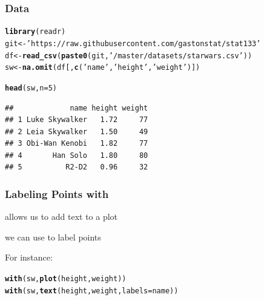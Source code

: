 \documentclass[12pt]{beamer}\usepackage[]{graphicx}\usepackage[]{color}
\makeatletter
\newcommand{\hlnum}[1]{\textcolor[rgb]{0.686,0.059,0.569}{#1}}%
\newcommand{\hlstr}[1]{\textcolor[rgb]{0.192,0.494,0.8}{#1}}%
\newcommand{\hlstd}[1]{\textcolor[rgb]{0.345,0.345,0.345}{#1}}%
\newcommand{\hlkwb}[1]{\textcolor[rgb]{0.69,0.353,0.396}{#1}}%
\newcommand{\hlkwc}[1]{\textcolor[rgb]{0.333,0.667,0.333}{#1}}%
\newcommand{\hlkwd}[1]{\textcolor[rgb]{0.737,0.353,0.396}{\textbf{#1}}}%
\newenvironment{kframe}{%
 \def\at@end@of@kframe{}%
 \ifinner\ifhmode%
  \def\at@end@of@kframe{\end{minipage}}%
  \begin{minipage}{\columnwidth}%
 \fi\fi%
 \def\FrameCommand##1{\hskip\@totalleftmargin \hskip-\fboxsep
 \colorbox{shadecolor}{##1}\hskip-\fboxsep
     \hskip-\linewidth \hskip-\@totalleftmargin \hskip\columnwidth}%
 \MakeFramed {\advance\hsize-\width
   \@totalleftmargin\z@ \linewidth\hsize
   \@setminipage}}%
 {\par\unskip\endMakeFramed%
 \at@end@of@kframe}
\newenvironment{knitrout}{}{} %
\makeatother
\begin{document}
\begin{frame}[fragile]
\frametitle{Data }

\begin{knitrout}\footnotesize
{}\color{fgcolor}\begin{kframe}
\begin{alltt}
\hlkwd{library}\hlstd{(readr)}
\hlstd{git} \hlkwb{<-} \hlstr{'https://raw.githubusercontent.com/gastonstat/stat133'}
\hlstd{df} \hlkwb{<-} \hlkwd{read_csv}\hlstd{(}\hlkwd{paste0}\hlstd{(git,} \hlstr{'/master/datasets/starwars.csv'}\hlstd{))}
\hlstd{sw} \hlkwb{<-} \hlkwd{na.omit}\hlstd{(df[ ,}\hlkwd{c}\hlstd{(}\hlstr{'name'}\hlstd{,} \hlstr{'height'}\hlstd{,} \hlstr{'weight'}\hlstd{)])}
\end{alltt}
\end{kframe}
\end{knitrout}



\begin{knitrout}\footnotesize
{}\color{fgcolor}\begin{kframe}
\begin{alltt}
\hlkwd{head}\hlstd{(sw,} \hlkwc{n} \hlstd{=} \hlnum{5}\hlstd{)}
\end{alltt}
\begin{verbatim}
##             name height weight
## 1 Luke Skywalker   1.72     77
## 2 Leia Skywalker   1.50     49
## 3 Obi-Wan Kenobi   1.82     77
## 4       Han Solo   1.80     80
## 5          R2-D2   0.96     32
\end{verbatim}
\end{kframe}
\end{knitrout}

\end{frame}


\begin{frame}[fragile]
\frametitle{Labeling Points with}

\bi
  \item {} allows us to add text to a plot
  \item we can use  to label points
\ei

\bigskip
For instance:
\begin{knitrout}\footnotesize
{}\color{fgcolor}\begin{kframe}
\begin{alltt}
\hlkwd{with}\hlstd{(sw,} \hlkwd{plot}\hlstd{(height, weight))}
\hlkwd{with}\hlstd{(sw,} \hlkwd{text}\hlstd{(height, weight,} \hlkwc{labels} \hlstd{= name))}
\end{alltt}
\end{kframe}
\end{knitrout}

\end{frame}
\end{document}
